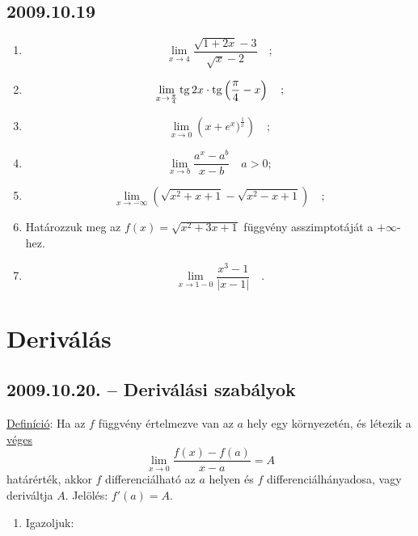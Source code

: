 \subsection*{2009.10.19}
\begin{enumerate}
\item $$\lim_{x\to 4}\frac{\sqrt{1+2x}-3}{\sqrt{x}-2}\quad;$$
\item $$\lim_{x\to\frac{\pi}{4}}\mathop{\mathrm{tg}}\nolimits 2x\cdot\mathop{\mathrm{tg}}\nolimits\left(\frac{\pi}{4}-x\right)\quad;$$
\item $$\lim_{x\to 0}\left(x+e^x)^{\frac{1}{x}}\right)\quad;$$
\item $$\lim_{x\to b}\frac{a^x-a^b}{x-b}\quad a>0;$$
\item $$\lim_{x\to -\infty}\left(\sqrt{x^2+x+1}-\sqrt{x^2-x+1}\right)\quad;$$
\item Határozzuk meg az $f(x)=\sqrt{x^2+3x+1}$ függvény asszimptotáját a $+\infty$-hez.
\item $$\lim_{x\to 1-0}\frac{x^3-1}{|x-1|}\quad.$$
\end{enumerate}


\section{Deriválás}

\subsection*{2009.10.20. -- Deriválási szabályok}
\underline{Definíció}: Ha az $f$ függvény értelmezve van az \underline{$a$} hely egy 								környezetén, és létezik a \underline{véges} 
						\[ \lim_{x \to 0} \frac{f(x)-f(a)}{x-a} = A \]
						határérték, akkor $f$ differenciálható az \underline{$a$} helyen 							és $f$ differenciálhányadosa, vagy deriváltja $A$. Jelölés: 								$f'(a)=A$.

\begin{enumerate}
\item Igazoljuk:

\end{enumerate}

